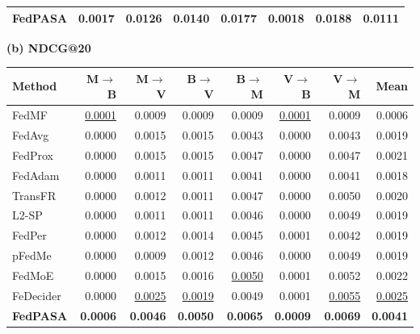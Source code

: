 {\begin{minipage}{\textwidth}
\begin{tabular*}{\linewidth}{@{\extracolsep{\fill}}lrrrrrrr@{}}
\midrule
\textbf{FedPASA} & \textbf{0.0017} & \textbf{0.0126} & \textbf{0.0140} & \textbf{0.0177} & \textbf{0.0018} & \textbf{0.0188} & \textbf{0.0111} \\
\bottomrule
\end{tabular*}
\par\medskip
\textbf{(b) NDCG@20}\par\smallskip
\begin{tabular*}{\linewidth}{@{\extracolsep{\fill}}lrrrrrrr@{}}
\toprule
\textbf{Method} & \textbf{M$\to$B} & \textbf{M$\to$V} & \textbf{B$\to$V} & \textbf{B$\to$M} & \textbf{V$\to$B} & \textbf{V$\to$M} & \textbf{Mean} \\
\midrule
FedMF~\citep{ammad2019federated} & \underline{0.0001} & 0.0009 & 0.0009 & 0.0009 & \underline{0.0001} & 0.0009 & 0.0006 \\
FedAvg~\citep{mcmahan2017communication} & 0.0000 & 0.0015 & 0.0015 & 0.0043 & 0.0000 & 0.0043 & 0.0019 \\
FedProx~\citep{li2020federated} & 0.0000 & 0.0015 & 0.0015 & 0.0047 & 0.0000 & 0.0047 & 0.0021 \\
FedAdam~\citep{reddi2021adaptive} & 0.0000 & 0.0011 & 0.0011 & 0.0041 & 0.0000 & 0.0041 & 0.0018 \\
TransFR~\citep{zhang2026transfr} & 0.0000 & 0.0012 & 0.0011 & 0.0047 & 0.0000 & 0.0050 & 0.0020 \\
L2-SP~\citep{li2018explicit} & 0.0000 & 0.0011 & 0.0011 & 0.0046 & 0.0000 & 0.0049 & 0.0019 \\
FedPer~\citep{arivazhagan2019federated} & 0.0000 & 0.0012 & 0.0014 & 0.0045 & 0.0001 & 0.0042 & 0.0019 \\
pFedMe~\citep{dinh2020personalized} & 0.0000 & 0.0009 & 0.0012 & 0.0046 & 0.0000 & 0.0049 & 0.0019 \\
FedMoE~\citep{mei2024fedmoe} & 0.0000 & 0.0015 & 0.0016 & \underline{0.0050} & 0.0001 & 0.0052 & 0.0022 \\
FeDecider~\citep{he2026fedecider} & 0.0000 & \underline{0.0025} & \underline{0.0019} & 0.0049 & 0.0001 & \underline{0.0055} & \underline{0.0025} \\
\midrule
\textbf{FedPASA} & \textbf{0.0006} & \textbf{0.0046} & \textbf{0.0050} & \textbf{0.0065} & \textbf{0.0009} & \textbf{0.0069} & \textbf{0.0041} \\
\bottomrule
\end{tabular*}
\end{minipage}

\par\medskip

}
